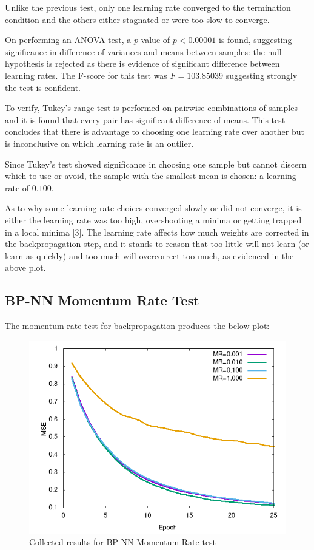 \documentclass[a4paper,12pt]{article}
\begin{document}
Unlike the previous test, only one learning rate converged to the termination condition and the others either stagnated or were too slow to converge.

On performing an ANOVA test, a $p$ value of $p < 0.00001$ is found, suggesting significance in difference of variances and means between samples: the null hypothesis is rejected as there is evidence of significant difference between learning rates. The F-score for this test was $F = 103.85039$ suggesting strongly the test is confident.

To verify, Tukey's range test is performed on pairwise combinations of samples and it is found that every pair has significant difference of means. This test concludes that there is advantage to choosing one learning rate over another but is inconclusive on which learning rate is an outlier.

Since Tukey's test showed significance in choosing one sample but cannot discern which to use or avoid, the sample with the smallest mean is chosen: a learning rate of $0.100$.

\pagebreak

As to why some learning rate choices converged slowly or did not converge, it is either the learning rate was too high, overshooting a minima or getting trapped in a local minima [3]. The learning rate affects how much weights are corrected in the backpropagation step, and it stands to reason that too little will not learn (or learn as quickly) and too much will overcorrect too much, as evidenced in the above plot.

\subsection{BP-NN Momentum Rate Test}

The momentum rate test for backpropagation produces the below plot:

\begin{figure}[h!]
\centering
\includegraphics[scale=0.60]{images/bp-mr-plot.png}
\caption{Collected results for BP-NN Momentum Rate test}
\label{fig:bp-nn-mr}
\end{figure}
\end{document}
